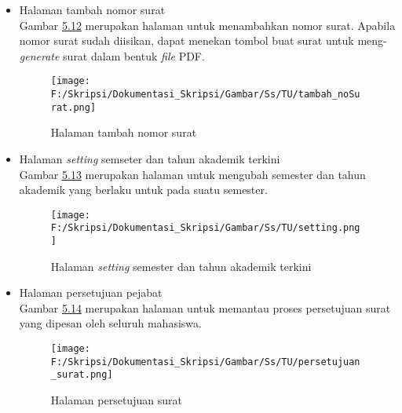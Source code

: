\begin{itemize}
	\item Halaman tambah nomor surat\\
	 Gambar \hyperlink{halaman_tambah_nomor_surat}{5.12} merupakan halaman untuk menambahkan nomor surat. Apabila nomor surat sudah diisikan, dapat menekan tombol buat surat untuk meng-\textit{generate} surat dalam bentuk \textit{file} PDF.
	 \begin{figure}[H]
	\centering
		\texttt{[image: F:/Skripsi/Dokumentasi\_Skripsi/Gambar/Ss/TU/tambah\_noSurat.png]}
		\caption{Halaman tambah nomor surat}
		\label{fig:halaman_tambah_nomor_surat}
	\end{figure}
	
	\item Halaman \textit{setting} semseter dan tahun akademik terkini\\
	 Gambar \hyperlink{halaman_setting_semester_dan_tahun_akademik_terkini}{5.13} merupakan halaman untuk mengubah semester dan tahun akademik yang berlaku untuk pada suatu semester.
	 \begin{figure}[H]
	\centering
		\texttt{[image: F:/Skripsi/Dokumentasi\_Skripsi/Gambar/Ss/TU/setting.png]}
		\caption{Halaman \textit{setting} semester dan tahun akademik terkini}
		\label{fig:halaman_setting_semester_dan_tahun_akademik_terkini}
	\end{figure}
	
	\item Halaman persetujuan pejabat\\
	 Gambar \hyperlink{halaman_persetujuan_pejabat}{5.14} merupakan halaman untuk memantau proses persetujuan surat yang dipesan oleh seluruh mahasiswa.
	 \begin{figure}[H]
	\centering
		\texttt{[image: F:/Skripsi/Dokumentasi\_Skripsi/Gambar/Ss/TU/persetujuan\_surat.png]}
		\caption{Halaman persetujuan surat}
		\label{fig:halaman_persetujuan_pejabat}
	\end{figure}
\end{itemize}
	
